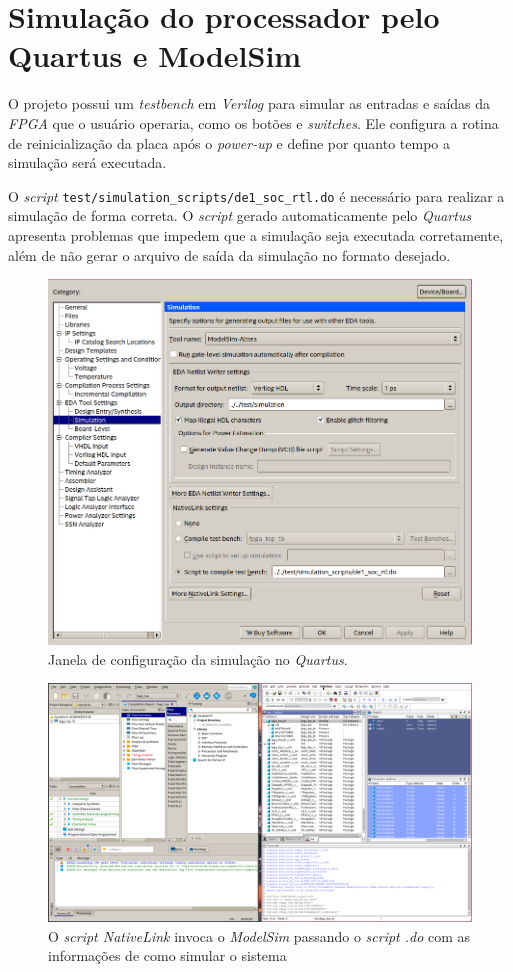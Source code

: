 \section{Simulação do processador pelo Quartus e ModelSim}
    { O projeto possui um \textit{testbench} em \textit{Verilog} para simular as
        entradas e saídas da \textit{FPGA} que o usuário operaria, como os botões
        e \textit{switches}. Ele configura a rotina de reinicialização da placa
        após o \textit{power-up} e define por quanto tempo a simulação será
        executada.
    }

    { O \textit{script} \texttt{test/simulation\_scripts/de1\_soc\_rtl.do} é
        necessário para realizar a simulação de forma correta. O \textit{script}
        gerado automaticamente pelo \textit{Quartus} apresenta problemas que
        impedem que a simulação seja executada corretamente, além de não gerar
        o arquivo de saída da simulação no formato desejado.
    }
    \begin{figure}[H]
    \centering
        \includegraphics[width=.6\linewidth]{../images/quartus/simulation_config.png}
        \caption{Janela de configuração da simulação no \textit{Quartus}.}
        \label{fig:quartus_simulation_config}
    \end{figure}

    \begin{figure}[H]
    \centering
        \includegraphics[width=.6\linewidth]{../images/quartus/quartus_modelsim.png}
        \caption{O \textit{script NativeLink} invoca o \textit{ModelSim} passando
            o \textit{script .do} com as informações de como simular o sistema}
        \label{fig:quartus_modelsim}
    \end{figure}

